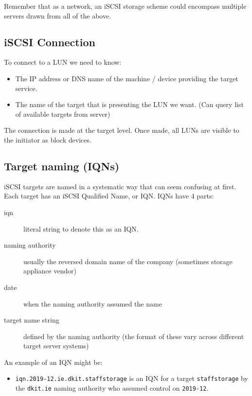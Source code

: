 Remember that as a network, an iSCSI storage scheme could encompass
multiple servers drawn from all of the above.

\subsection{iSCSI Connection}
\label{sec:connection}

To connect to a LUN we need to know:

\begin{itemize}
\item
  The IP address or DNS name of the machine / device providing the
  target service.
\item
  The name of the target that is presenting the LUN we want. (Can query
  list of available targets from server)
\end{itemize}

The connection is made at the target level. Once made, all LUNs are
visible to the initiator as block devices.

\subsection{Target naming (IQNs)}
\label{sec:target-naming-iqns}

iSCSI targets are named in a systematic way that can seem confusing at
first. Each target has an iSCSI Qualified Name, or IQN. IQNs have 4
parts:

\begin{description}
\item[iqn]
literal string to denote this as an IQN.
\item[naming authority]
usually the reversed domain name of the company (sometimes storage
appliance vendor)
\item[date]
when the naming authority assumed the name
\item[target name string]
defined by the naming authority (the format of these vary across
different target server systems)
\end{description}

An example of an IQN might be:

\begin{itemize}
\item
  \texttt{iqn.2019-12.ie.dkit.staffstorage} is an IQN for a target
  \texttt{staffstorage} by the \texttt{dkit.ie} naming authority who
  assumed control on \texttt{2019-12}.
\end{itemize}

